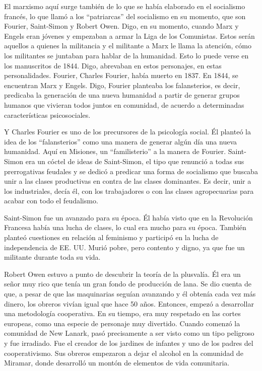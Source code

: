 \documentclass[
  a4paper,
]{article}
\begin{document}
El marxismo aquí surge también de lo que se había elaborado en el
socialismo francés, lo que llamó a los ``patriarcas'' del socialismo en
su momento, que son Fourier, Saint-Simon y Robert Owen. Digo, en su
momento, cuando Marx y Engels eran jóvenes y empezaban a armar la Liga
de los Comunistas. Estos serán aquellos a quienes la militancia y el
militante a Marx le llama la atención, cómo los militantes se juntaban
para hablar de la humanidad. Esto lo puede verse en los manuscritos de
1844. Digo, abrevaban en estos personajes, en estas personalidades.
Fourier, Charles Fourier, había muerto en 1837. En 1844, se encuentran
Marx y Engels. Digo, Fourier planteaba los falansterios, es decir,
predicaba la generación de una nueva humanidad a partir de generar
grupos humanos que vivieran todos juntos en comunidad, de acuerdo a
determinadas características psicosociales.

Y Charles Fourier es uno de los precursores de la psicología social. Él
planteó la idea de los ``falansterios'' como una manera de generar algún
día una nueva humanidad. Aquí en Misiones, un ``familisterio'' a la
manera de Fourier. Saint-Simon era un cóctel de ideas de Saint-Simon, el
tipo que renunció a todas sus prerrogativas feudales y se dedicó a
predicar una forma de socialismo que buscaba unir a las clases
productivas en contra de las clases dominantes. Es decir, unir a los
industriales, decía él, con los trabajadores o con las clases
agropecuarias para acabar con todo el feudalismo.

Saint-Simon fue un avanzado para su época. Él había visto que en la
Revolución Francesa había una lucha de clases, lo cual era mucho para su
época. También planteó cuestiones en relación al feminismo y participó
en la lucha de independencia de EE. UU. Murió pobre, pero contento y
digno, ya que fue un militante durante toda su vida.

Robert Owen estuvo a punto de descubrir la teoría de la plusvalía. Él
era un señor muy rico que tenía un gran fondo de producción de lana. Se
dio cuenta de que, a pesar de que las maquinarias seguían avanzando y él
obtenía cada vez más dinero, los obreros vivían igual que hace 50 años.
Entonces, empezó a desarrollar una metodología cooperativa. En su
tiempo, era muy respetado en las cortes europeas, como una especie de
personaje muy divertido. Cuando comenzó la comunidad de New Lanark, pasó
precisamente a ser visto como un tipo peligroso y fue irradiado. Fue el
creador de los jardines de infantes y uno de los padres del
cooperativismo. Sus obreros empezaron a dejar el alcohol en la comunidad
de Miramar, donde desarrolló un montón de elementos de vida comunitaria.
\end{document}
